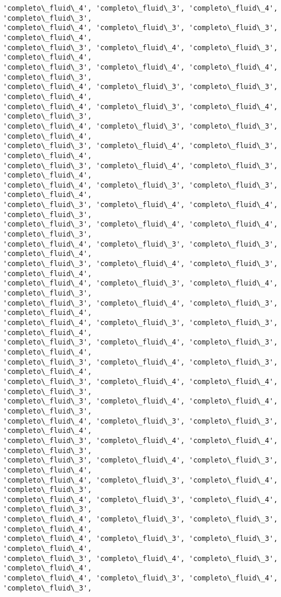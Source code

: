 \documentclass[11pt]{article}
\begin{document}
\begin{Verbatim}[commandchars=\\\{\}]
'completo\_fluid\_4', 'completo\_fluid\_3', 'completo\_fluid\_4', 'completo\_fluid\_3',
'completo\_fluid\_4', 'completo\_fluid\_3', 'completo\_fluid\_3', 'completo\_fluid\_4',
'completo\_fluid\_3', 'completo\_fluid\_4', 'completo\_fluid\_3', 'completo\_fluid\_4',
'completo\_fluid\_3', 'completo\_fluid\_4', 'completo\_fluid\_4', 'completo\_fluid\_3',
'completo\_fluid\_4', 'completo\_fluid\_3', 'completo\_fluid\_3', 'completo\_fluid\_4',
'completo\_fluid\_4', 'completo\_fluid\_3', 'completo\_fluid\_4', 'completo\_fluid\_3',
'completo\_fluid\_4', 'completo\_fluid\_3', 'completo\_fluid\_3', 'completo\_fluid\_4',
'completo\_fluid\_3', 'completo\_fluid\_4', 'completo\_fluid\_3', 'completo\_fluid\_4',
'completo\_fluid\_3', 'completo\_fluid\_4', 'completo\_fluid\_3', 'completo\_fluid\_4',
'completo\_fluid\_4', 'completo\_fluid\_3', 'completo\_fluid\_3', 'completo\_fluid\_4',
'completo\_fluid\_3', 'completo\_fluid\_4', 'completo\_fluid\_4', 'completo\_fluid\_3',
'completo\_fluid\_3', 'completo\_fluid\_4', 'completo\_fluid\_4', 'completo\_fluid\_3',
'completo\_fluid\_4', 'completo\_fluid\_3', 'completo\_fluid\_3', 'completo\_fluid\_4',
'completo\_fluid\_3', 'completo\_fluid\_4', 'completo\_fluid\_3', 'completo\_fluid\_4',
'completo\_fluid\_4', 'completo\_fluid\_3', 'completo\_fluid\_4', 'completo\_fluid\_3',
'completo\_fluid\_3', 'completo\_fluid\_4', 'completo\_fluid\_3', 'completo\_fluid\_4',
'completo\_fluid\_4', 'completo\_fluid\_3', 'completo\_fluid\_3', 'completo\_fluid\_4',
'completo\_fluid\_3', 'completo\_fluid\_4', 'completo\_fluid\_3', 'completo\_fluid\_4',
'completo\_fluid\_3', 'completo\_fluid\_4', 'completo\_fluid\_3', 'completo\_fluid\_4',
'completo\_fluid\_3', 'completo\_fluid\_4', 'completo\_fluid\_4', 'completo\_fluid\_3',
'completo\_fluid\_3', 'completo\_fluid\_4', 'completo\_fluid\_4', 'completo\_fluid\_3',
'completo\_fluid\_4', 'completo\_fluid\_3', 'completo\_fluid\_3', 'completo\_fluid\_4',
'completo\_fluid\_3', 'completo\_fluid\_4', 'completo\_fluid\_4', 'completo\_fluid\_3',
'completo\_fluid\_3', 'completo\_fluid\_4', 'completo\_fluid\_3', 'completo\_fluid\_4',
'completo\_fluid\_4', 'completo\_fluid\_3', 'completo\_fluid\_4', 'completo\_fluid\_3',
'completo\_fluid\_4', 'completo\_fluid\_3', 'completo\_fluid\_4', 'completo\_fluid\_3',
'completo\_fluid\_4', 'completo\_fluid\_3', 'completo\_fluid\_3', 'completo\_fluid\_4',
'completo\_fluid\_4', 'completo\_fluid\_3', 'completo\_fluid\_3', 'completo\_fluid\_4',
'completo\_fluid\_3', 'completo\_fluid\_4', 'completo\_fluid\_3', 'completo\_fluid\_4',
'completo\_fluid\_4', 'completo\_fluid\_3', 'completo\_fluid\_4', 'completo\_fluid\_3',

\end{Verbatim}
\end{document}
